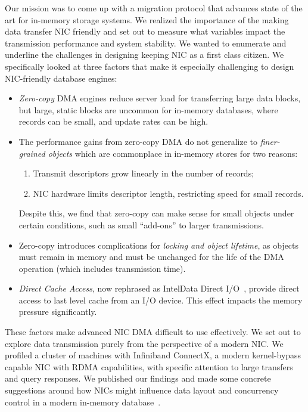 Our mission was to come up with a migration protocol that advances state of the art for in-memory storage systems.
We realized the importance of the making data transfer NIC friendly and set out to measure what variables impact the 
transmission performance and system stability. We wanted to enumerate and underline the challenges in designing keeping NIC as a first class citizen.
We specifically looked at three factors that make it especially challenging to design NIC-friendly
database engines:
\begin{itemize}
  \item {\em Zero-copy} DMA engines reduce server load for transferring large data
    blocks, but large, static blocks are uncommon for in-memory databases,
    where records can be small, and update rates can be high.
  \item The performance gains from zero-copy DMA do not generalize to
      {\em finer-grained objects} which are commonplace in in-memory stores for two reasons:
      \begin{enumerate}
        \item Transmit descriptors grow linearly in the number of records;
        \item NIC hardware limits descriptor length, restricting speed for small records.
      \end{enumerate}
      Despite this, we find that zero-copy can make sense for small objects under certain conditions, such as
      small ``add-ons'' to larger transmissions.
   \item Zero-copy introduces complications for \emph{locking and object
      lifetime}, as objects must remain in memory and must be
      unchanged for the life of the DMA operation (which includes transmission
      time).
  \item {\em Direct Cache Access}, now rephrased as Intel\textregistered Data Direct I/O~\cite{ddio},
      provide direct access to last level cache from an I/O device. This effect
      impacts the memory pressure significantly.
\end{itemize}


These factors make advanced NIC DMA difficult to use effectively. We set out to explore data 
transmission purely from the perspective of a modern NIC. We profiled a cluster of machines with
Infiniband ConnectX, a modern kernel-bypass capable NIC
with RDMA capabilities, with specific attention to large transfers and query responses.
We published our findings and made some concrete suggestions around how NICs might
influence data layout and concurrency control in a modern in-memory 
database~\cite{imdmpaper}. 

